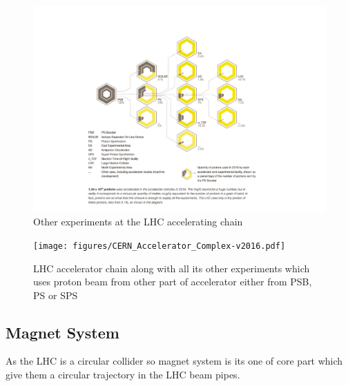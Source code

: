 \begin{figure}[!htbp]
	\centering
	\includegraphics[width=1.0\textwidth]{figures/LHC/distribution_of_protons_en.pdf}
	\caption{Other experiments at the LHC accelerating chain \cite{OtherExpAtLHCAcceleratingChain}}
	\label{fig:OtherExpAtAccStructure}
\end{figure}
\begin{figure}[!htbp]
	\centering
	\texttt{[image: figures/CERN\_Accelerator\_Complex-v2016.pdf]}
	\caption{LHC accelerator chain along with all its other experiments which uses proton beam from other part of accelerator either from PSB, PS or SPS\cite{Fig-CERN-accelerator-complex}}
	\label{fig:CERN-accelerator-complex}
\end{figure}
\subsection{Magnet System}
As the LHC is a circular collider so magnet system is its one of core part which give them a circular trajectory in the LHC beam pipes. %

